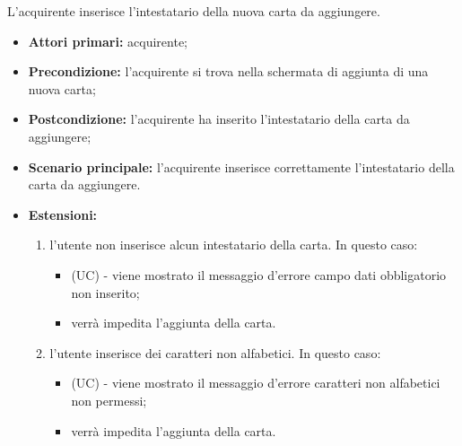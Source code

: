 \resetSubSubUC

L'acquirente inserisce l'intestatario della nuova carta da aggiungere.
\begin{itemize}
    \item \textbf{Attori primari:} acquirente;
    \item \textbf{Precondizione:} l'acquirente si trova nella schermata di aggiunta di una nuova carta;
    \item \textbf{Postcondizione:} l'acquirente ha inserito l'intestatario della carta da aggiungere;
    \item \textbf{Scenario principale:} l'acquirente inserisce correttamente l'intestatario della carta da aggiungere.
    \item \textbf{Estensioni:}
    \begin{enumerate}[label=\lett]
        \item l'utente non inserisce alcun intestatario della carta. In questo caso:
        \begin{itemize}
            \item (UC) - viene mostrato il messaggio d'errore campo dati obbligatorio non inserito;
            \item verrà impedita l'aggiunta della carta.
        \end{itemize}
        \item l'utente inserisce dei caratteri non alfabetici. In questo caso:
        \begin{itemize}
            \item (UC) - viene mostrato il messaggio d'errore caratteri non alfabetici non permessi;
            \item verrà impedita l'aggiunta della carta.
        \end{itemize}
    \end{enumerate}
\end{itemize}

